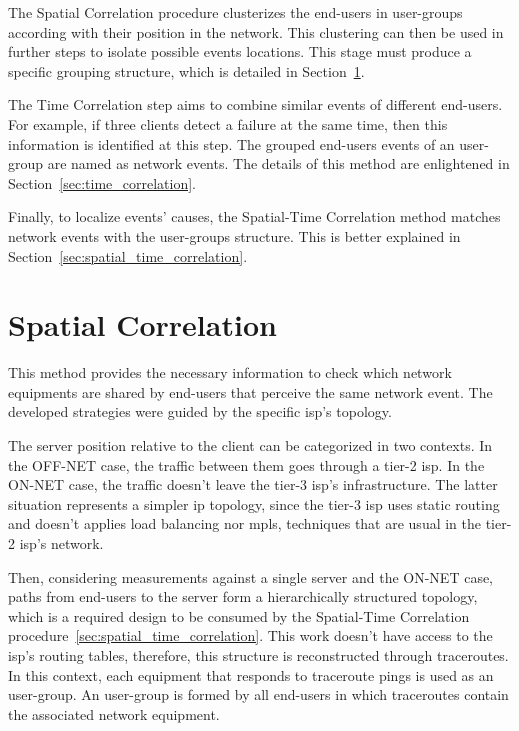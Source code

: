 The Spatial Correlation procedure clusterizes the end-users in user-groups
according with their position in the network. This clustering can then be used
in further steps to isolate possible events locations.
This stage must produce a specific grouping structure, which is detailed in
Section~\ref{sec:spatial_correlation}.

The Time Correlation step aims to combine similar events of different
end-users. For example, if three clients detect a failure at
the same time, then this information is identified at this step.
The grouped end-users events of an user-group are named as network events.
The details of this method are enlightened in
Section~\ref{sec:time_correlation}.

Finally, to localize events' causes, the Spatial-Time Correlation method
matches network events with the user-groups structure.
This is better explained in Section~\ref{sec:spatial_time_correlation}.

\section{Spatial Correlation}
\label{sec:spatial_correlation}

This method provides the necessary information to check which network
equipments
are shared by end-users that perceive the same network event.
The developed strategies were guided by the specific \gls*{isp}'s topology.

The server position relative to the client
can be categorized in two contexts.
In the OFF-NET case, the traffic between them
goes through a tier-2 \gls*{isp}\@.
In the ON-NET case, the traffic
doesn't leave the tier-3 \gls*{isp}'s infrastructure.
The latter situation represents a simpler \gls*{ip} topology, since the tier-3 \gls*{isp}
uses static routing and
doesn't applies load balancing nor \gls*{mpls}, techniques that are usual in the tier-2
\gls*{isp}'s network.

Then, considering measurements against a single server and the ON-NET
case, paths from end-users to the server form a hierarchically
structured topology, which is a required design to be consumed by the
Spatial-Time Correlation procedure~\ref{sec:spatial_time_correlation}.
This work doesn't have access to the \gls*{isp}'s routing tables,
therefore, this structure is reconstructed through traceroutes.
In this context, each equipment that responds to traceroute
pings is used as an user-group.
An user-group is formed by all end-users in which traceroutes contain the
associated network equipment.

